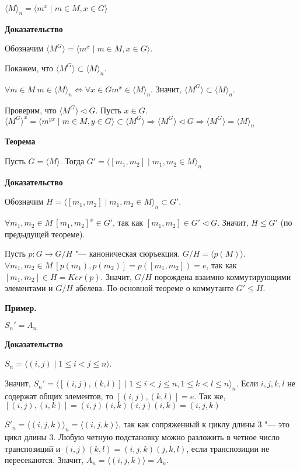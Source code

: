 \documentclass{article}
\begin{document}
$\langle M \rangle_n = \langle m^x \mid m \in M, x \in G \rangle$

\textbf{Доказательство}

Обозначим $\langle M^G \rangle = \langle m^x \mid m \in M, x \in G \rangle$.

Покажем, что $\langle M^G \rangle \subset \langle M \rangle_n$.

$\forall m \in M \  m \in \langle M \rangle_n \Leftrightarrow \forall x \in G m^x \in \langle M \rangle_n$. Значит, $\langle M^G \rangle \subset \langle M \rangle_n$.

Проверим, что $\langle M^G \rangle \triangleleft G$. Пусть $x \in G$. $\langle M^G \rangle^x = \langle m^{yx} \mid m \in M, y \in G \rangle \subset \langle M^G \rangle \Rightarrow \langle M^G \rangle \triangleleft G \Rightarrow \langle M^G \rangle = \langle M \rangle_n$

\vspace{10pt}

\textbf{Теорема}

Пусть $G = \langle M \rangle$. Тогда $G' = \langle [m_1, m_2] \mid m_1, m_2 \in M \rangle_n$

\textbf{Доказательство}

Обозначим $H = \langle [m_1, m_2] \mid m_1, m_2 \in M \rangle_n \subset G'$.

$\forall m_1, m_2 \in M \  [m_1, m_2]^x \in G'$, так как $[m_1, m_2] \in G' \triangleleft G$. Значит, $H \leq G'$ (по предыдущей теореме).

Пусть $p: G \rightarrow G/H$ "--- каноническая сюръекция. $G/H = \langle p(M) \rangle$. $\forall m_1, m_2 \in M \  [p(m_1), p(m_2)] = p([m_1, m_2]) = e$, так как $[m_1, m_2] \in H = Ker(p)$. Значит, $G/H$ порождена взаимно коммутирующими элементами и $G/H$ абелева. По основной теореме о коммутанте $G' \leq H$.

\vspace{5pt}

\textbf{Пример.}

$S_n' = A_n$

\textbf{Доказательство}

$S_n = \langle (i, j) \mid 1 \leq i < j \leq n \rangle$.

Значит, $S_n' = \langle [(i, j), (k, l)] \mid 1 \leq i < j \leq n, 1 \leq k < l \leq n \rangle_n$. Если $i, j, k, l$ не содержат общих элементов, то $[(i, j), (k, l)] = e$. Так же, $[(i, j),(i, k)] = (i, j)(i, k)(i, j)(i, k) = (i, j, k)$

$S'_n = \langle (i, j, k) \rangle_n = \langle (i, j, k) \rangle$, так как сопряженный к циклу длины 3 "--- это цикл длины 3. Любую четную подстановку можно разложить в четное число транспозиций и $(i, j)(k, l) = (i, j, k)(j, k, l)$, если транспозиции не пересекаются. Значит, $A_n = \langle (i, j, k) \rangle = A_n$.
\end{document}
